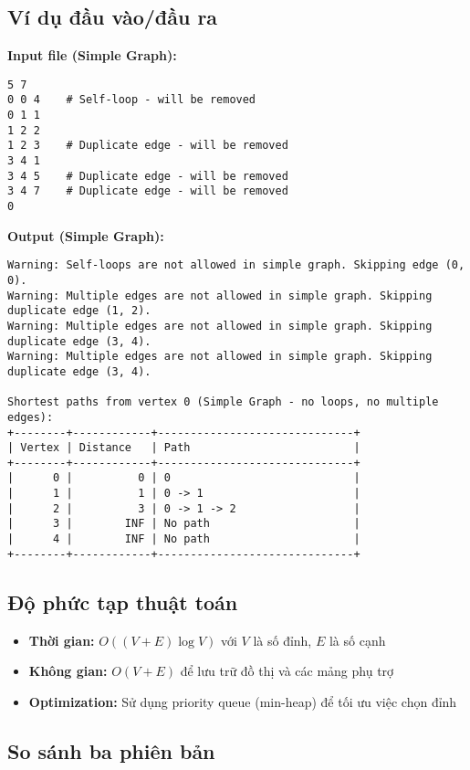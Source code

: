 \documentclass[12pt]{article}
\begin{document}
\subsection*{Ví dụ đầu vào/đầu ra}

\textbf{Input file (Simple Graph):}
\begin{verbatim}
5 7
0 0 4    # Self-loop - will be removed
0 1 1
1 2 2
1 2 3    # Duplicate edge - will be removed
3 4 1
3 4 5    # Duplicate edge - will be removed
3 4 7    # Duplicate edge - will be removed
0
\end{verbatim}

\textbf{Output (Simple Graph):}
\begin{verbatim}
Warning: Self-loops are not allowed in simple graph. Skipping edge (0, 0).
Warning: Multiple edges are not allowed in simple graph. Skipping duplicate edge (1, 2).
Warning: Multiple edges are not allowed in simple graph. Skipping duplicate edge (3, 4).
Warning: Multiple edges are not allowed in simple graph. Skipping duplicate edge (3, 4).

Shortest paths from vertex 0 (Simple Graph - no loops, no multiple edges):
+--------+------------+------------------------------+
| Vertex | Distance   | Path                         |
+--------+------------+------------------------------+
|      0 |          0 | 0                            |
|      1 |          1 | 0 -> 1                       |
|      2 |          3 | 0 -> 1 -> 2                  |
|      3 |        INF | No path                      |
|      4 |        INF | No path                      |
+--------+------------+------------------------------+
\end{verbatim}

\subsection*{Độ phức tạp thuật toán}

\begin{itemize}
    \item \textbf{Thời gian:} $O((V + E) \log V)$ với $V$ là số đỉnh, $E$ là số cạnh
    \item \textbf{Không gian:} $O(V + E)$ để lưu trữ đồ thị và các mảng phụ trợ
    \item \textbf{Optimization:} Sử dụng priority queue (min-heap) để tối ưu việc chọn đỉnh
\end{itemize}

\subsection*{So sánh ba phiên bản}
\end{document}
